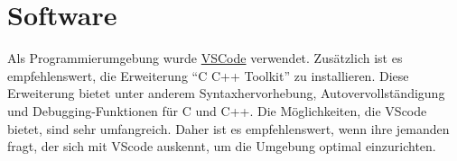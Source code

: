 \section{Software}
\label{sec:reference:software}

Als Programmierumgebung wurde \href{https://code.visualstudio.com/}{VSCode} verwendet. Zusätzlich ist es empfehlenswert, die Erweiterung ``C C++ Toolkit'' zu installieren. Diese Erweiterung bietet unter anderem Syntaxhervorhebung, Autovervollständigung und Debugging-Funktionen für C und C++. Die Möglichkeiten, die VScode bietet, sind sehr umfangreich. Daher ist es empfehlenswert, wenn ihre jemanden fragt, der sich mit VScode auskennt, um die Umgebung optimal einzurichten.


